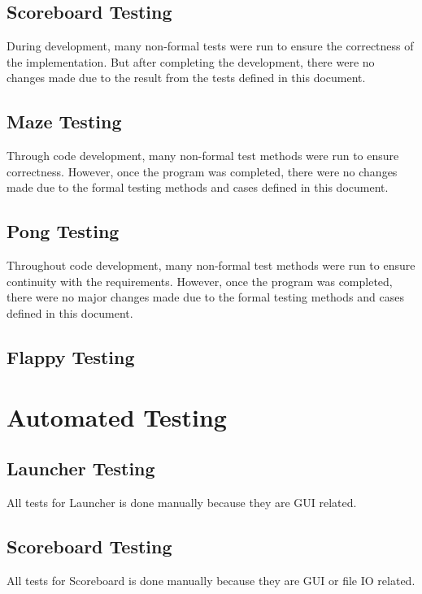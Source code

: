 \documentclass[12pt, titlepage]{article}
\begin{document}
	\subsection{Scoreboard Testing}
	During development, many non-formal tests were run to ensure the correctness of the implementation. But after completing the development, there were no changes made due to the result from the tests defined in this document.

	\subsection{Maze Testing}
	Through code development, many non-formal test methods were run to ensure correctness. However, once the program was completed, there were no changes made due to the formal testing methods and cases defined in this document.
	
	\subsection{Pong Testing}
	Throughout code development, many non-formal test methods were run to ensure continuity with the requirements. However, once the program was completed, there were no major changes made due to the formal testing methods and cases defined in this document.
	
	\subsection{Flappy Testing}

\section{Automated Testing}	

	\subsection{Launcher Testing}
	    All tests for Launcher is done manually because they are GUI related.
	    
	\subsection{Scoreboard Testing}
	    All tests for Scoreboard is done manually because they are GUI or file IO related.
		
\end{document}
